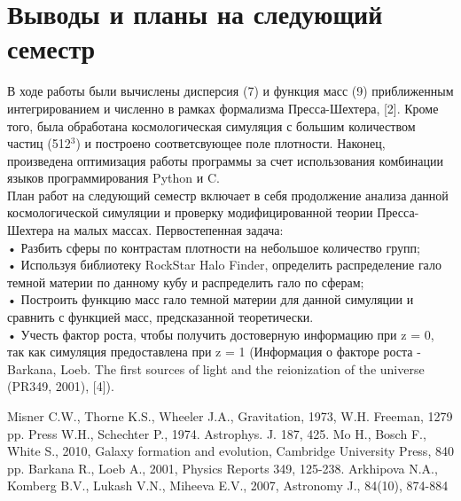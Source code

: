 \documentclass[11pt]{article}
\begin{document}
\section{Выводы и планы на следующий семестр}
В ходе работы были вычислены дисперсия (7) и функция масс (9) приближенным интегрированием и численно в рамках формализма Пресса-Шехтера, [2]. Кроме того, была обработана космологическая симуляция с большим количеством частиц (512$^3$) и построено соответсвующее поле плотности. Наконец, произведена оптимизация работы программы за счет использования комбинации языков программирования Python и C.\\
План работ на следующий семестр включает в себя продолжение анализа данной космологической симуляции и проверку модифицированной теории Пресса-Шехтера на малых массах. Первостепенная задача:\\
•	Разбить сферы по контрастам плотности на небольшое количество групп;\\
•	Используя библиотеку RockStar Halo Finder, определить распределение гало темной материи по данному кубу и распределить гало по сферам;\\
•	Построить функцию масс гало темной материи для данной симуляции и сравнить с функцией масс, предсказанной теоретически.\\
•	Учесть фактор роста, чтобы получить достоверную информацию при z = 0, так как симуляция предоставлена при z = 1 (Информация о факторе роста - Barkana, Loeb. The first sources of light and the reionization of the universe (PR349, 2001), [4]).

\begin{thebibliography}{9}
Misner C.W., Thorne K.S., Wheeler J.A., Gravitation, 1973, W.H. Freeman, 1279 pp.
Press W.H., Schechter P., 1974. Astrophys. J. 187, 425.
Mo H., Bosch F., White S., 2010, Galaxy formation and evolution,  Cambridge University Press, 840 pp.
Barkana R., Loeb A., 2001, Physics Reports 349, 125-238.
Arkhipova N.A., Komberg B.V., Lukash V.N., Miheeva E.V., 2007, Astronomy J., 84(10), 874-884
\end{thebibliography}
\end{document}
